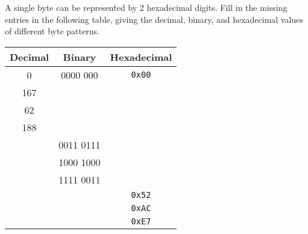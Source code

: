 \documentclass[12pt]{article}
\newenvironment{ex}[2][Exercise]{\begin{trivlist}
		\item[\hskip \labelsep {\bfseries #1}\hskip \labelsep {\bfseries #2.}]}{\end{trivlist}}
\begin{document}
\begin{ex}{2.3}
	A single byte can be represented by 2 hexadecimal digits. Fill in the missing
	entries in the following table, giving the decimal, binary, and hexadecimal
	values of different byte patterns.
	\begin{center}
		\begin{tabular}{ccc}
			Decimal & Binary & Hexadecimal\\
			\hline
			0 & 0000 000 & \texttt{0x00}\\
			167 & \makebox[1cm]{\hrulefill} & \makebox[1cm]{\hrulefill}\\
			62 & \makebox[1cm]{\hrulefill} & \makebox[1cm]{\hrulefill}\\
			188 & \makebox[1cm]{\hrulefill} & \makebox[1cm]{\hrulefill}\\
			\makebox[1cm]{\hrulefill} & 0011 0111 & \makebox[1cm]{\hrulefill}\\
			\makebox[1cm]{\hrulefill} & 1000 1000 & \makebox[1cm]{\hrulefill}\\
			\makebox[1cm]{\hrulefill} & 1111 0011 & \makebox[1cm]{\hrulefill}\\
			\makebox[1cm]{\hrulefill} & \makebox[1cm]{\hrulefill} & \texttt{0x52}\\
			\makebox[1cm]{\hrulefill} & \makebox[1cm]{\hrulefill} & \texttt{0xAC}\\
			\makebox[1cm]{\hrulefill} & \makebox[1cm]{\hrulefill} & \texttt{0xE7}		\end{tabular}
	\end{center}
\end{ex}
\end{document}

